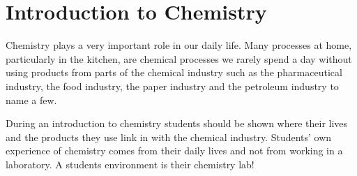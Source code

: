\section{Introduction to Chemistry}



Chemistry plays a very important role in our
daily life. Many processes at home, particularly
in the kitchen, are chemical processes we rarely
spend a day without using products from parts
of the chemical industry such as the
pharmaceutical industry, the food industry, the
paper industry and the petroleum industry to
name a few.

During an introduction to chemistry students
should be shown where their lives and the
products they use link in with the chemical
industry. Students' own experience of chemistry comes
from their daily lives and not from working in a
laboratory. A students environment is their
chemistry lab!

